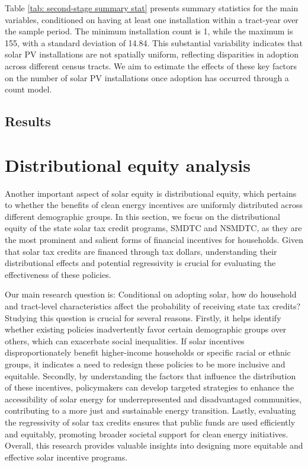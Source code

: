 \documentclass[12pt,twoside,letterpaper]{article}
\begin{document}
Table \ref{tab: second-stage summary stat} presents summary statistics for the main variables, conditioned on having at least one installation within a tract-year over the sample period. The minimum installation count is 1, while the maximum is 155, with a standard deviation of 14.84. This substantial variability indicates that solar PV installations are not spatially uniform, reflecting disparities in adoption across different census tracts. We aim to estimate the effects of these key factors on the number of solar PV installations once adoption has occurred through a count model. 


\subsection{Results}


\newpage
\section{Distributional equity analysis}

Another important aspect of solar equity is distributional equity, which pertains to whether the benefits of clean energy incentives are uniformly distributed across different demographic groups. In this section, we focus on the distributional equity of the state solar tax credit programs, SMDTC and NSMDTC, as they are the most prominent and salient forms of financial incentives for households. Given that solar tax credits are financed through tax dollars, understanding their distributional effects and potential regressivity is crucial for evaluating the effectiveness of these policies.

Our main research question is: Conditional on adopting solar, how do household and tract-level characteristics affect the probability of receiving state tax credits? Studying this question is crucial for several reasons. Firstly, it helps identify whether existing policies inadvertently favor certain demographic groups over others, which can exacerbate social inequalities. If solar incentives disproportionately benefit higher-income households or specific racial or ethnic groups, it indicates a need to redesign these policies to be more inclusive and equitable. Secondly, by understanding the factors that influence the distribution of these incentives, policymakers can develop targeted strategies to enhance the accessibility of solar energy for underrepresented and disadvantaged communities, contributing to a more just and sustainable energy transition. Lastly, evaluating the regressivity of solar tax credits ensures that public funds are used efficiently and equitably, promoting broader societal support for clean energy initiatives. Overall, this research provides valuable insights into designing more equitable and effective solar incentive programs.
\end{document}
